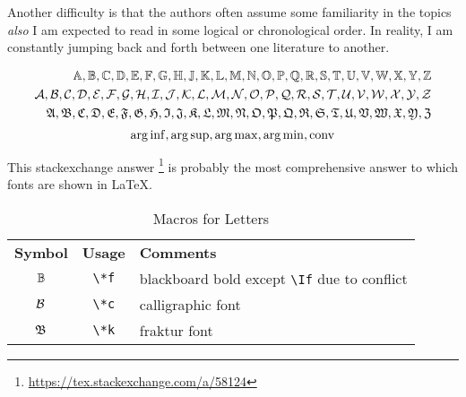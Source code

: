 Another difficulty is that  the authors often assume some familiarity in the topics
\textit{also} I am expected to read in some logical or chronological order.
In reality, I am constantly jumping back and forth between one literature to another.

\begin{align*}
    \Af, \Bf, \Cf, \Df, \Ef, \Ff, \Gf, \Hf, \Jf, \Kf, \Lf, \Mf, \Nf, \Of, \Pf, \Qf, \Rf, \Sf, \Tf, \Uf, \Vf, \Wf, \Xf, \Yf, \Zf      \\
    \Ac, \Bc, \Cc, \Dc, \Ec, \Fc, \Gc, \Hc, \Ic, \Jc, \Kc, \Lc, \Mc, \Nc, \Oc, \Pc, \Qc, \Rc, \Sc, \Tc, \Uc, \Vc, \Wc, \Xc, \Yc, \Zc \\
    \Ak, \Bk, \Ck, \Dk, \Ek, \Fk, \Gk, \Hk, \Ik, \Jk, \Kk, \Lk, \Mk, \Nk, \Ok, \Pk, \Qk, \Rk, \Sk, \Tk, \Uk, \Vk, \Wk, \Xk, \Yk, \Zk
\end{align*}
$$
    \operatorname*{arg\, inf}, \operatorname*{arg\, sup}, \operatorname*{arg\, max}, \operatorname*{arg\, min}, \mathrm{conv}
$$

This stackexchange answer \footnote{\url{https://tex.stackexchange.com/a/58124}}
is probably the most comprehensive answer to which fonts are shown in \LaTeX.

\begin{table}[h!]
    \centering\renewcommand{\arraystretch}{1.2}
    \begin{tabular}{ccl}
        \textbf{Symbol} & \textbf{Usage} & \textbf{Comments}                                 \\
        $\mathbb{B}$           & \verb|\*f|     & blackboard bold except \verb|\If| due to conflict \\
        $\mathcal{B}$           & \verb|\*c|     & calligraphic font                                 \\
        $\mathfrak{B}$           & \verb|\*k|     & fraktur font                                      \\
    \end{tabular}
    \label{tab:macro-letters}
    \caption{Macros for Letters}
\end{table}